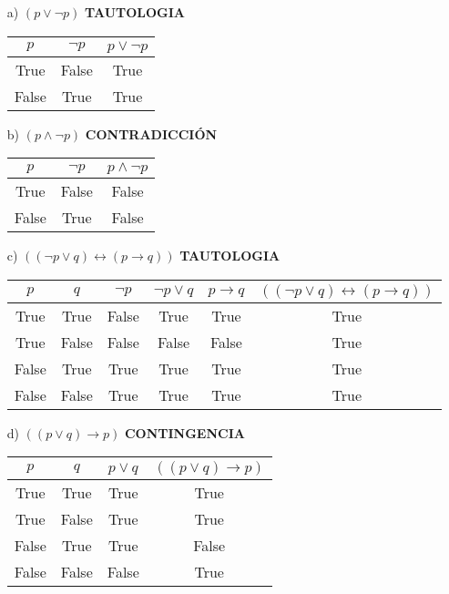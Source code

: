 \documentclass[10pt,a4paper]{article}
\begin{document}
\begin{enumerate}
\item[a)] $(p\vee \neg p)$ \textbf{TAUTOLOGIA}

\begin{tabular}{| c | c | c |}
\hline
$p$ & $\neg p$ & $p \vee \neg p$\\ \hline
True & False & True\\
False & True & True\\ \hline
\end{tabular}

\item[b)]$(p \wedge \neg p)$ \textbf{CONTRADICCIÓN}

\begin{tabular}{| c | c | c |}
\hline
$p$ & $\neg p$ & $p \wedge \neg p$\\ \hline
True & False & False\\
False & True & False\\ \hline
\end{tabular}

\item[c)]$((\neg p \vee q) \leftrightarrow (p \rightarrow q))$ \textbf{TAUTOLOGIA}

\begin{tabular}{| c | c | c | c | c | c |}
\hline
$p$ & $q$ & $\neg p$ & $\neg p \vee q$ & $p \rightarrow q$ & $((\neg p \vee q) \leftrightarrow (p \rightarrow q))$ \\ \hline
True & True & False & True & True & True\\
True & False & False & False & False & True \\
False & True & True & True & True & True\\
False & False & True & True & True & True\\ \hline
\end{tabular}

\item[d)]$((p \vee q) \rightarrow p)$ \textbf{CONTINGENCIA}

\begin{tabular}{|c|c|c|c|}
\hline
$p$ & $q$ & $p \vee q$ & $((p \vee q) \rightarrow p)$ \\ \hline
True  & True  & True  & True \\ 
True  & False & True  & True \\
False & True  & True  & False \\
False & False & False & True \\ \hline


\end{tabular}
\end{enumerate}
\end{document}
